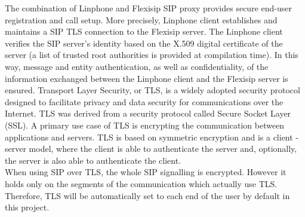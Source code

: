     \noindent The combination of Linphone and Flexisip SIP proxy provides secure end-user registration and call setup.
    More precisely, Linphone client establishes and maintains a SIP TLS connection to the Flexisip server. 
    The Linphone client verifies the SIP server’s identity based on the X.509 digital certificate of the server (a list of trusted root authorities is provided at compilation time). 
    In this way, message and entity authentication, as well as confidentiality, of the information exchanged between the Linphone client and the Flexisip server is ensured. 
    Transport Layer Security, or TLS, is a widely adopted security protocol designed to facilitate privacy and data security for communications over the Internet. 
    TLS was derived from a security protocol called Secure Socket Layer (SSL). A primary use case of TLS is encrypting the communication between applications and servers. 
    TLS is based on symmetric encryption and is a client - server model, where the client is able to authenticate the server and, optionally, the server is also able to authenticate the client. \\

    \noindent When using SIP over TLS, the whole SIP signalling is encrypted. However it holds only on the segments of the communication which actually use TLS. 
    Therefore, TLS will be automatically set to each end of the user by default in this project. 

